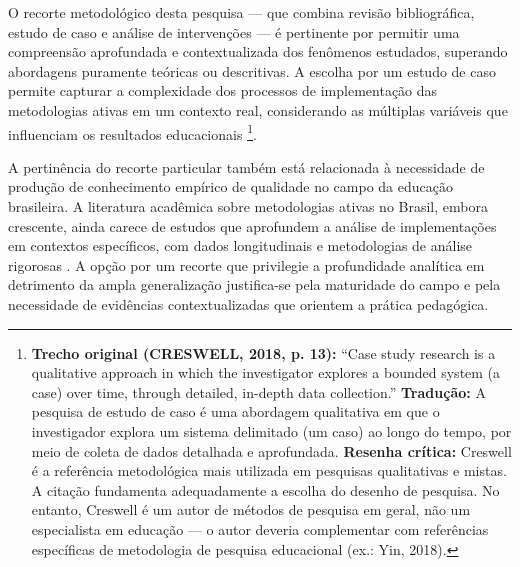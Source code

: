 O recorte metodológico desta pesquisa — que combina revisão bibliográfica, estudo de caso e análise de intervenções — é pertinente por permitir uma compreensão aprofundada e contextualizada dos fenômenos estudados, superando abordagens puramente teóricas ou descritivas. A escolha por um estudo de caso permite capturar a complexidade dos processos de implementação das metodologias ativas em um contexto real, considerando as múltiplas variáveis que influenciam os resultados educacionais \cite{CRESWELL2018}\footnote{\textbf{Trecho original (CRESWELL, 2018, p. 13):} ``Case study research is a qualitative approach in which the investigator explores a bounded system (a case) over time, through detailed, in-depth data collection.'' \textbf{Tradução:} A pesquisa de estudo de caso é uma abordagem qualitativa em que o investigador explora um sistema delimitado (um caso) ao longo do tempo, por meio de coleta de dados detalhada e aprofundada. \textbf{Resenha crítica:} Creswell é a referência metodológica mais utilizada em pesquisas qualitativas e mistas. A citação fundamenta adequadamente a escolha do desenho de pesquisa. No entanto, Creswell é um autor de métodos de pesquisa em geral, não um especialista em educação — o autor deveria complementar com referências específicas de metodologia de pesquisa educacional (ex.: Yin, 2018).}.

A pertinência do recorte particular também está relacionada à necessidade de produção de conhecimento empírico de qualidade no campo da educação brasileira. A literatura acadêmica sobre metodologias ativas no Brasil, embora crescente, ainda carece de estudos que aprofundem a análise de implementações em contextos específicos, com dados longitudinais e metodologias de análise rigorosas \cite{PAIVA2016}. A opção por um recorte que privilegie a profundidade analítica em detrimento da ampla generalização justifica-se pela maturidade do campo e pela necessidade de evidências contextualizadas que orientem a prática pedagógica.

